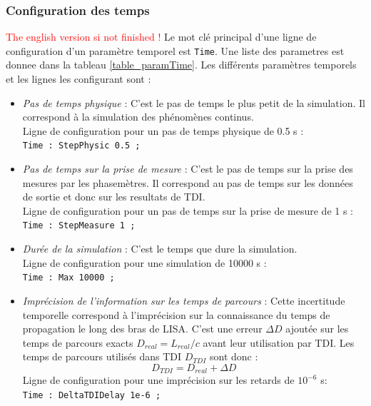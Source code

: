\documentclass[a4paper,english,12pt]{article}
\begin{document}
\subsubsection{Configuration des temps}
\label{SSSConfigTime}
\textcolor{red}{The english version si not finished !} 
Le mot cl\'e principal d'une ligne de configuration d'un param\`etre temporel est  \texttt{Time}. Une liste des parametres est donnee dans la tableau \ref{table_paramTime}. Les diff\'erents param\`etres temporels et les lignes les configurant sont :
\begin{itemize}
\item { \it Pas de temps physique} : C'est le pas de temps le plus petit de la simulation. Il correspond \`a la simulation des ph\'enom\`enes continus.\\
Ligne de configuration pour un pas de temps physique de 0.5 s : \\
\hphantom{aaaaa}\texttt{Time : StepPhysic 0.5 ;}  \\

\item { \it Pas de temps sur la prise de mesure } : C'est le pas de temps sur la prise des mesures par les phasem\`etres. Il correspond au pas de temps sur les donn\'ees de sortie et donc sur les resultats de TDI. \\
Ligne de configuration pour un pas de temps sur la prise de mesure de 1 s : \\
\hphantom{aaaaa}\texttt{Time : StepMeasure 1 ;}  \\ 

\item { \it Dur\'ee de la simulation } : C'est le temps que dure la simulation. \\
Ligne de configuration pour une simulation de 10000 s : \\
\hphantom{aaaaa}\texttt{Time : Max 10000 ;}  \\ 

\item { \it Impr\'ecision de l'information sur les temps de parcours} : Cette incertitude temporelle correspond \`a l'impr\'ecision sur la connaissance du temps de propagation le long des bras de LISA. C'est une erreur $\Delta D$ ajout\'ee sur les temps de parcours exacts $D_{real} = L_{real} / c$ avant leur utilisation par TDI. Les temps de parcours utilis\'es dans TDI $D_{TDI}$ sont donc : \\
\begin{equation}
D_{TDI} = D_{real} + \Delta D
\end{equation}
Ligne de configuration pour une impr\'ecision sur les retards de $10^{-6}$ s: \\
\hphantom{aaaaa}\texttt{Time : DeltaTDIDelay 1e-6 ;}  \\ 


\end{itemize}
\end{document}
